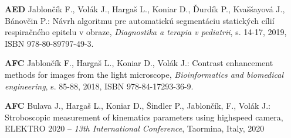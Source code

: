\noindent \textbf{AED} Jablončík F., Volák J., Hargaš L., Koniar D., Ďurdík P., Kvaššayová J., Bánovčin P.: Návrh algoritmu pre automatickú segmentáciu statických cílií respiračného epitelu v obraze, \textit{Diagnostika a terapia v pediatrii}, s. 14-17, 2019, ISBN 978-80-89797-49-3. \newline

\noindent \textbf{AFC} Jablončík F., Hargaš L., Koniar D., Volák J.: Contrast enhancement methods for images from the light microscope,\textit{ Bioinformatics and biomedical engineering}, s. 85-88, 2018, ISBN 978-84-17293-36-9. \newline

\noindent \textbf{AFC} Bulava J., Hargaš L., Koniar D., Šindler P., Jablončík, F., Volák J.: Stroboscopic measurement of kinematics parameters using highspeed camera, ELEKTRO 2020 – \textit{13th International Conference}, Taormina, Italy, 2020 \newline
